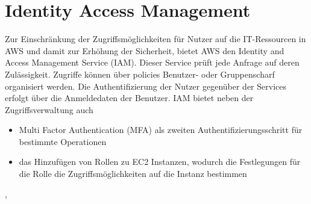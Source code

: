 \section{Identity Access Management}
\label{sec:iam}
Zur Einschränkung der Zugriffsmöglichkeiten für Nutzer auf die IT-Ressourcen in AWS und damit zur Erhöhung der Sicherheit, bietet AWS den Identity and Access Management Service (IAM). Dieser Service prüft jede Anfrage auf deren Zulässigkeit. Zugriffe können über policies Benutzer- oder Gruppenscharf organisiert werden. Die Authentifizierung der Nutzer gegenüber der Services erfolgt über die Anmeldedaten der Benutzer. IAM bietet neben der Zugriffsverwaltung auch
\begin{itemize}
  \item Multi Factor Authentication (MFA) als zweiten Authentifizierungsschritt für bestimmte Operationen
  \item das Hinzufügen von Rollen zu EC2 Instanzen, wodurch die Festlegungen für die Rolle die Zugriffsmöglichkeiten auf die Instanz bestimmen
\end{itemize}
\cite{vliet:resilience}, \cite{wittig:awsinaction}



